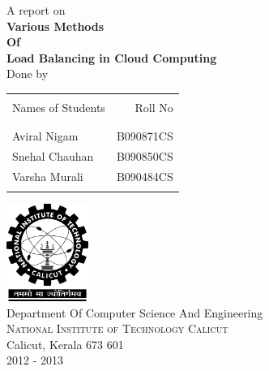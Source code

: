 \begin{titlepage}

\begin{center}

\textup{\large A report on}\\[1.0cm]

\center \Large \textbf {Various Methods}\\
\center \Large \textbf {Of}\\
\center \Large \textbf {Load Balancing in Cloud Computing}\\[2.0cm]

\normalsize Done by \\
\begin{table}[h]
\centering
\begin{tabular}{lr}\hline \\
Names of Students & Roll No \\ \\ \hline
\\
Aviral Nigam & B090871CS     \\
Snehal Chauhan & B090850CS    \\ 
Varsha Murali & B090484CS  \\ \\ \hline 
\end{tabular}
\end{table}

\begin{flushleft}\end{flushleft}
\vspace{-0.25cm}
\begin{flushleft}\end{flushleft}
\vspace{-0.35cm}
\begin{flushleft}\end{flushleft}

\vspace{+1.0cm}
\includegraphics[width=0.20\textwidth]{./nitc-logo}\\[1cm]
\Large{Department Of Computer Science And Engineering}\\
\normalsize
\textsc{National Institute of Technology Calicut}\\
Calicut, Kerala 673 601 \\
\vspace{0.5cm}
2012 - 2013

\end{center}

\end{titlepage}
